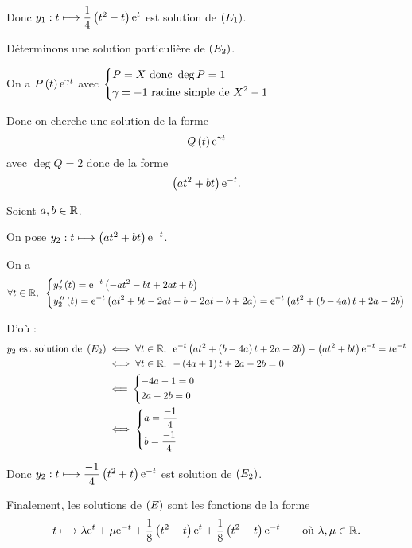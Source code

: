 \begin{corr}[2]
Donc \(y_1:t\longmapsto\dfrac{1}{4}\left(t^2-t\right)\mathrm{e}^{t}\) est solution de \(\left(E_1\right)\).

Déterminons une solution particulière de \(\left(E_2\right)\).

\begin{brouill}
On a \(P\left(t\right)\mathrm{e}^{\gamma t}\) avec \(\begin{dcases}
P=X\text{ donc }\deg P=1 \\
\gamma=-1\text{ racine simple de }X^2-1
\end{dcases}\)

Donc on cherche une solution de la forme \[Q\left(t\right)\mathrm{e}^{\gamma t}\] avec \(\deg Q=2\) donc de la forme \[\left(at^2+bt\right)\mathrm{e}^{-t}.\]
\end{brouill}

Soient \(a,b\in\mathbb{R}\).

On pose \(y_2:t\longmapsto\left(at^2+bt\right)\mathrm{e}^{-t}\).

On a \[\quantifs{\forall t\in\R}\begin{dcases}
y_2\prim\paren{t}=\e{-t}\paren{-at^2-bt+2at+b} \\
y_2\seconde\paren{t}=\e{-t}\paren{at^2+bt-2at-b-2at-b+2a}=\e{-t}\paren{at^2+\paren{b-4a}t+2a-2b}
\end{dcases}\]

D'où : \[\begin{aligned}
y_2\text{ est solution de }\paren{E_2}&\ssi\quantifs{\forall t\in\R}\e{-t}\paren{at^2+\paren{b-4a}t+2a-2b}-\paren{at^2+bt}\e{-t}=t\e{-t} \\
&\ssi\quantifs{\forall t\in\R}-\paren{4a+1}t+2a-2b=0 \\
&\impr\begin{dcases}
-4a-1=0 \\
2a-2b=0
\end{dcases} \\
&\ssi\begin{dcases}
a=\dfrac{-1}{4} \\
b=\dfrac{-1}{4}
\end{dcases}
\end{aligned}\]

Donc \(y_2:t\longmapsto\dfrac{-1}{4}\left(t^2+t\right)\mathrm{e}^{-t}\) est solution de \(\left(E_2\right)\).

Finalement, les solutions de \(\left(E\right)\) sont les fonctions de la forme \[t\longmapsto\lambda\mathrm{e}^{t}+\mu\mathrm{e}^{-t}+\dfrac{1}{8}\left(t^2-t\right)\mathrm{e}^{t}+\dfrac{1}{8}\left(t^2+t\right)\mathrm{e}^{-t}\qquad\text{où }\lambda,\mu\in\mathbb{R}.\]
\end{corr}

